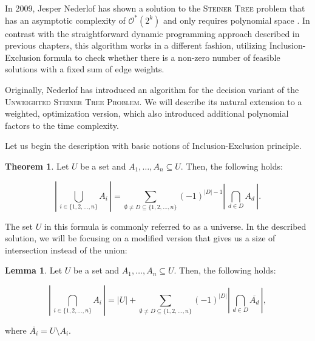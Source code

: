 \documentclass[thesis=M,english,hidelinks]{FITthesis}[2012/10/20]
\theoremstyle{definition}
\newtheorem{theorem}{Theorem}
\newtheorem{lemma}{Lemma}
\begin{document}
In 2009, Jesper Nederlof has shown a solution to the \textsc{Steiner Tree} problem that has an asymptotic complexity of
$\mathcal{O}^*(2^k)$ and only requires polynomial space \cite{Nederlof2013}. In contrast with the straightforward
dynamic programming approach described in previous chapters, this algorithm works in a different fashion, utilizing
Inclusion-Exclusion formula to check whether there is a non-zero number of feasible solutions with a fixed sum of edge
weights.

Originally, Nederlof has introduced an algorithm for the decision variant of the \textsc{Unweighted Steiner Tree Problem}.
We will describe its natural extension to a weighted, optimization version, which also introduced additional polynomial
factors to the time complexity.

Let us begin the description with basic notions of Inclusion-Exclusion principle.

\begin{theorem}
    \label{inex:union}
    Let $U$ be a set and $A_1, \ldots, A_n \subseteq U$. Then, the following holds:

    $$
    \left\lvert\,\bigcup_{i \in \{1, 2, \ldots, n\}} A_i\,\right\rvert = \sum_{\emptyset \neq D \subseteq \{1, 2,
    \ldots, n \}} (-1)^{|D|-1} \left\lvert\,\bigcap_{d \in D} A_d\,\right\rvert.
    $$

\end{theorem}

The set $U$ in this formula is commonly referred to as a universe. In the described solution, we will be focusing on a
modified version that gives us a size of intersection instead of the union:

\begin{lemma}
    \label{inex:intersect}
    Let $U$ be a set and $A_1, \ldots, A_n \subseteq U$. Then, the following holds:

    $$
    \left\lvert\,\bigcap_{i \in \{1, 2, \ldots, n\}} A_i\,\right\rvert = |U| + \sum_{\emptyset \neq D \subseteq \{1, 2,
    \ldots, n \}} (-1)^{|D|} \left\lvert\,\bigcap_{d \in D} \overline{A_d}\,\right\rvert,
    $$

    where $\overline{A_i} = U \setminus A_i$.
\end{lemma}
\end{document}
